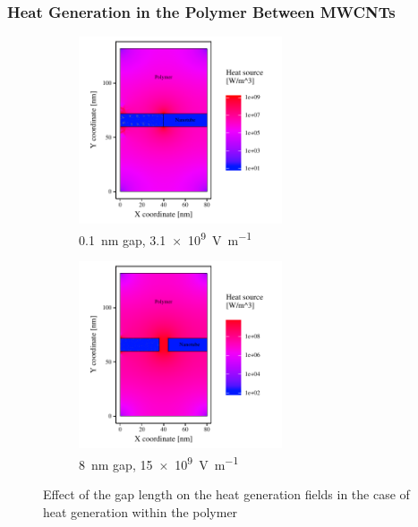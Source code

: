\documentclass[11pt,review,times]{elsarticle}
\begin{document}
\subsubsection{Heat Generation in the Polymer Between MWCNTs}
	\label{subsection:mechanism3}

\begin{figure}[htb]
	\centering
	\begin{subfigure}{60mm}
		\centering
		\captionsetup{width=55mm}
		\includegraphics[width=60mm]{resultats_0,1nm_comsol_2D_puissance}
		\caption{\SI{0.1}{\nano\metre} gap, \SI{3.1e9}{\volt\per\metre}}
		\label{fig:result_gap01nm_power}		
	\end{subfigure} 
	\begin{subfigure}{60mm}
		\centering
		\captionsetup{width=55mm}
		\includegraphics[width=60mm]{resultats_8nm_comsol_2D_puissance}
		\caption{\SI{8}{\nano\metre} gap, \SI{15e9}{\volt\per\metre}}
		\label{fig:result_gap8nm_power}		
	\end{subfigure}
	\caption{Effect of the gap length on the heat generation fields in the case of heat generation within the polymer}
	\label{fig:result_gap_power}
\end{figure}
\end{document}
